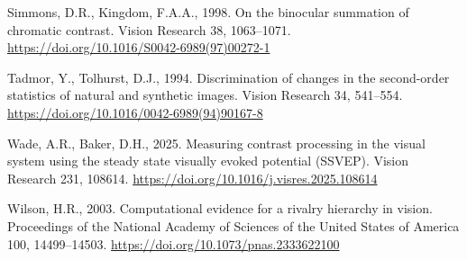 \documentclass[
  12pt,
]{article}
\newlength{\cslhangindent}
\newenvironment{CSLReferences}[2] %
 {\begin{list}{}{%
  \setlength{\itemindent}{0pt}
  \setlength{\leftmargin}{0pt}
  \setlength{\parsep}{0pt}
  \ifodd #1
   \setlength{\leftmargin}{\cslhangindent}
   \setlength{\itemindent}{-1\cslhangindent}
  \fi
  \setlength{\itemsep}{#2\baselineskip}}}
 {\end{list}}
\begin{document}
\begin{CSLReferences}{1}{0}
Simmons, D.R., Kingdom, F.A.A., 1998. On the binocular summation of
chromatic contrast. Vision Research 38, 1063--1071.
\url{https://doi.org/10.1016/S0042-6989(97)00272-1}

Tadmor, Y., Tolhurst, D.J., 1994. Discrimination of changes in the
second-order statistics of natural and synthetic images. Vision Research
34, 541--554. \url{https://doi.org/10.1016/0042-6989(94)90167-8}

Wade, A.R., Baker, D.H., 2025. Measuring contrast processing in the
visual system using the steady state visually evoked potential (SSVEP).
Vision Research 231, 108614.
\url{https://doi.org/10.1016/j.visres.2025.108614}

Wilson, H.R., 2003. Computational evidence for a rivalry hierarchy in
vision. Proceedings of the National Academy of Sciences of the United
States of America 100, 14499--14503.
\url{https://doi.org/10.1073/pnas.2333622100}

\end{CSLReferences}
\end{document}
